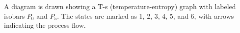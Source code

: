 A diagram is drawn showing a T-s (temperature-entropy) graph with labeled isobars \( P_0 \) and \( P_5 \). The states are marked as 1, 2, 3, 4, 5, and 6, with arrows indicating the process flow.
